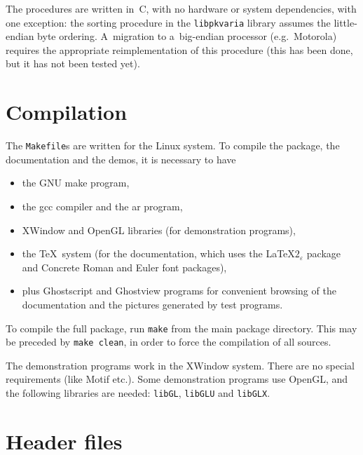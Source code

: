 The procedures are written in~C, with no hardware or system dependencies,
with one exception: the sorting procedure in the \texttt{libpkvaria} library
assumes the little-endian byte ordering. A~migration to a~big-endian processor
(e.g.\ Motorola) requires the appropriate reimplementation of this procedure
(this has been done, but it has not been tested yet).


\section{Compilation}

The \texttt{Makefile}s are written for the Linux system. To compile the package,
the documentation and the demos, it is necessary to have
\begin{itemize}
  \item the GNU make program,
  \item the gcc compiler and the ar program,
  \item XWindow and OpenGL libraries (for demonstration programs),
  \item the \TeX\ system (for the documentation, which
    uses the \LaTeX$2_{\varepsilon}$ package and Concrete Roman and Euler
    font packages),
  \item plus Ghostscript and Ghostview programs for convenient browsing
    of the documentation and the pictures generated by test programs.
\end{itemize}
To compile the full package, run \texttt{make} from the main package directory.
This may be preceded by \texttt{make clean}, in order to force the compilation
of all sources.

The demonstration programs work in the XWindow system. There are no special
requirements (like Motif etc.). Some demonstration programs use OpenGL, and
the following libraries are needed: \texttt{libGL}, \texttt{libGLU} and
\texttt{libGLX}.


\section{Header files}


